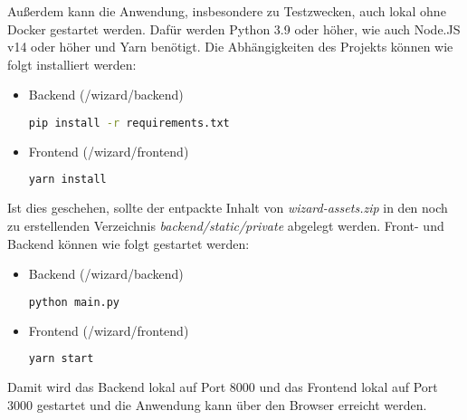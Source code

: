 Außerdem kann die Anwendung, insbesondere zu Testzwecken, auch lokal ohne Docker gestartet werden. Dafür werden Python 3.9 oder höher, wie auch Node.JS v14 oder höher und Yarn benötigt. Die Abhängigkeiten des Projekts können wie folgt installiert werden:

\begin{itemize}
	\item Backend (/wizard/backend)
	\begin{lstlisting}[language=bash]
	pip install -r requirements.txt
	\end{lstlisting}
	\item Frontend (/wizard/frontend)
	\begin{lstlisting}[language=bash]
	yarn install
	\end{lstlisting}
\end{itemize}

Ist dies geschehen, sollte der entpackte Inhalt von \textit{wizard-assets.zip} in den noch zu erstellenden Verzeichnis \textit{backend/static/private} abgelegt werden. Front- und Backend können wie folgt gestartet werden:

\begin{itemize}
	\item Backend (/wizard/backend)
	\begin{lstlisting}[language=bash]
	python main.py
	\end{lstlisting}
	\item Frontend (/wizard/frontend)
	\begin{lstlisting}[language=bash]
	yarn start
	\end{lstlisting}
\end{itemize}

Damit wird das Backend lokal auf Port 8000 und das Frontend lokal auf Port 3000 gestartet und die Anwendung kann über den Browser erreicht werden.
